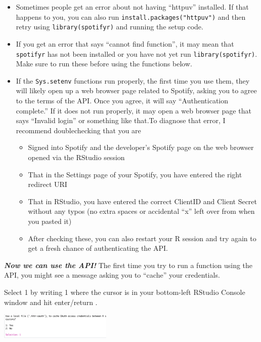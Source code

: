 \documentclass[
  letterpaper,
  DIV=11,
  numbers=noendperiod]{scrreprt}
\providecommand{\tightlist}{%
  \setlength{\itemsep}{0pt}\setlength{\parskip}{0pt}}\usepackage{longtable,booktabs,array}
\begin{document}
\begin{itemize}
\tightlist
\item
  Sometimes people get an error about not having ``httpuv'' installed.
  If that happens to you, you can also run
  \texttt{install.packages("httpuv")} and then retry using
  \texttt{library(spotifyr)} and running the setup code.
\item
  If you get an error that says ``cannot find function'', it may mean
  that \texttt{spotifyr} has not been installed or you have not yet run
  \texttt{library(spotifyr)}. Make sure to run these before using the
  functions below.
\item
  If the \texttt{Sys.setenv} functions run properly, the first time you
  use them, they will likely open up a web browser page related to
  Spotify, asking you to agree to the terms of the API. Once you agree,
  it will say ``Authentication complete.'' If it does not run properly,
  it may open a web browser page that says ``Invalid login'' or
  something like that.To diagnose that error, I recommend doublechecking
  that you are

  \begin{itemize}
  \tightlist
  \item
    Signed into Spotify and the developer's Spotify page on the web
    browser opened via the RStudio session
  \item
    That in the Settings page of your Spotify, you have entered the
    right redirect URI
  \item
    That in RStudio, you have entered the correct ClientID and Client
    Secret without any typos (no extra spaces or accidental ``x'' left
    over from when you pasted it)
  \item
    After checking these, you can also restart your R session and try
    again to get a fresh chance of authenticating the API.
  \end{itemize}
\end{itemize}

\textbf{\emph{Now we can use the API!}} The first time you try to run a
function using the API, you might see a message asking you to ``cache''
your credentials.

Select 1 by writing 1 where the cursor is in your bottom-left RStudio
Console window and hit enter/return .

\includegraphics[width=0.4\textwidth,height=\textheight]{images/cachespot.png}
\end{document}
